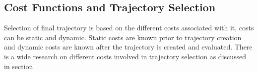 








\subsection{Cost Functions and Trajectory Selection} \label{traj_Selection}
Selection of final trajectory is based on the different costs associated with it, costs can be static and dynamic. Static costs are known prior to trajectory creation and dynamic costs are known after the trajectory is created and evaluated. There is a wide research on different costs involved in trajectory selection as discussed in section 

